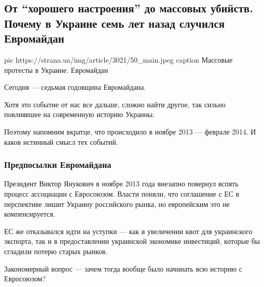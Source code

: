  
 
 
 
 
 
\subsection{От \enquote{хорошего настроения} до массовых убийств. Почему в Украине семь лет назад случился Евромайдан}
\label{sec:21_11_2020.news.ua.strana.1.maidan_7_let}

\ifcmt
pic https://strana.ua/img/article/3021/50_main.jpeg
caption Массовые протесты в Украине. Евромайдан 
\fi

Сегодня --- седьмая годовщина Евромайдана.

Хотя это событие от нас все дальше, сложно найти другое, так сильно
повлиявшее на современную историю Украины.

Поэтому напомним вкратце, что происходило в ноябре 2013 --- феврале 2014. И
каков истинный смысл тех событий.

\subsubsection{Предпосылки Евромайдана}

Президент Виктор Янукович в ноябре 2013 года внезапно повернул вспять процесс
ассоциации с Евросоюзом. Власти поняли, что соглашение с ЕС в перспективе лишит
Украину российского рынка, но европейским это не компенсируется.

ЕС же отказывался идти на уступки --- как в увеличении квот для украинского
экспорта, так и в предоставлении украинской экономике инвестиций, которые бы
сгладили потерю старых рынков.

Закономерный вопрос --- зачем тогда вообще было начинать всю историю с
Евросоюзом?

